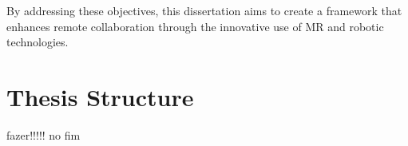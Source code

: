 By addressing these objectives, this dissertation aims to create a framework that enhances remote collaboration through the innovative use 
of \ac{MR} and robotic technologies.



\section{Thesis Structure}
% 
fazer!!!!! no fim 





